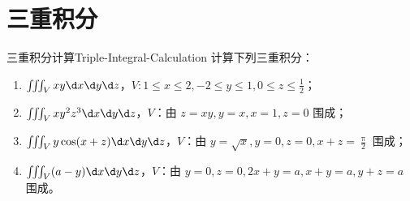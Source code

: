 \section{三重积分}

\begin{problem}{三重积分计算}{Triple-Integral-Calculation}
    计算下列三重积分：
    \begin{enumerate}
        \item $\iiint_V xy \d x \d y \d z$，$V: 1 \le x \le 2, -2 \le y \le 1, 0 \le z \le \frac{1}{2}$；
        \item $\iiint_V xy^2 z^3 \d x \d y \d z$，$V$：由 $z = xy, y = x, x = 1, z = 0$ 围成；
        \item $\iiint_V y \cos(x + z) \d x \d y \d z$，$V$：由 $y = \sqrt{x}, y = 0, z = 0, x + z = \frac{\uppi}{2}$ 围成；
        \item $\iiint_V (a - y) \d x \d y \d z$，$V$：由 $y = 0, z = 0, 2x + y = a, x + y = a, y + z = a$ 围成。
    \end{enumerate}
\end{problem}

